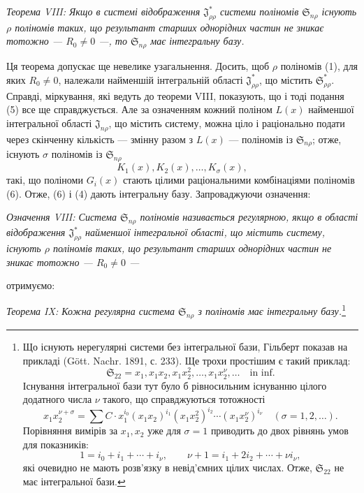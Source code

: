 \documentclass[11pt]{article}
\providecommand{\Ssys}{\mathfrak{S}}
\providecommand{\Jdom}{\mathfrak{J}}
\begin{document}
\emph{Теорема VIII: Якщо в системі відображення $\Jdom^*_{\rho\rho}$ системи поліномів $\Ssys_{n\rho}$ існують $\rho$ поліномів таких, що результант старших однорідних частин не зникає тотожно --- $R_0\ne0$ ---, то $\Ssys_{n\rho}$ має інтегральну базу.}

Ця теорема допускає ще невелике узагальнення. Досить, щоб $\rho$ поліномів (1), для яких $R_0\ne0$, належали найменшій інтегральній області $\Jdom^*_{\rho\rho}$, що містить $\Ssys^*_{\rho\rho}$. Справді, міркування, які ведуть до теореми VIII, показують, що і тоді подання (5) все ще справджується. Але за означенням кожний поліном $L(x)$ найменшої інтегральної області $\Jdom_{n\rho}$, що містить систему, можна ціло і раціонально подати через скінченну кількість --- змінну разом з $L(x)$ --- поліномів із $\Ssys_{n\rho}$; отже, існують $\sigma$ поліномів із $\Ssys_{n\rho}$
\begin{equation}
  K_1(x),K_2(x),\ldots,K_\sigma(x),
\tag{6}
\end{equation}
такі, що поліноми $G_i(x)$ стають цілими раціональними комбінаціями поліномів (6). Отже, (6) і (4) дають інтегральну базу. Запроваджуючи означення:

\emph{Означення VIII: Система $\Ssys_{n\rho}$ поліномів називається регулярною, якщо в області відображення $\Jdom^*_{\rho\rho}$ найменшої інтегральної області, що містить систему, існують $\rho$ поліномів таких, що результант старших однорідних частин не зникає тотожно --- $R_0\ne0$ ---}

отримуємо:

\emph{Теорема IX: Кожна регулярна система $\Ssys_{n\rho}$ з поліномів має інтегральну базу.}\footnote{Що існують нерегулярні системи без інтегральної бази, Гільберт показав на прикладі (Gött. Nachr. 1891, с. 233). Ще трохи простішим є такий приклад:
\[
  \Ssys_{22}=x_1,
  x_1x_2,
  x_1x_2^2,
  \ldots,
  x_1x_2^\nu,
  \ldots\quad\text{in inf.}
\]
Існування інтегральної бази тут було б рівносильним існуванню цілого додатного числа $\nu$ такого, що справджуються тотожності
\[
  x_1x_2^{\nu+\sigma}=\sum C\cdot x_1^{i_0}(x_1x_2)^{i_1}(x_1x_2^2)^{i_2}\cdots(x_1x_2^\nu)^{i_\nu}
  \quad(\sigma=1,2,\ldots).
\]
Порівняння вимірів за $x_1,x_2$ уже для $\sigma=1$ приводить до двох рівнянь умов для показників:
\[
  1=i_0+i_1+\cdots+i_\nu,
  \qquad
  \nu+1=i_1+2i_2+\cdots+\nu i_\nu,
\]
які очевидно не мають розв'язку в невід'ємних цілих числах. Отже, $\Ssys_{22}$ не має інтегральної бази.}
\end{document}
